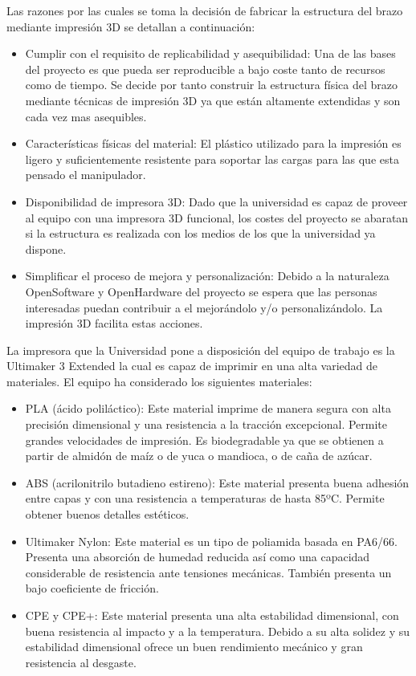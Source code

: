 Las razones por las cuales se toma la decisión de fabricar la estructura del brazo mediante impresión 3D se detallan a continuación:

\begin{itemize}
  \item Cumplir con el requisito de replicabilidad y asequibilidad: Una de las bases del proyecto es que pueda ser reproducible a bajo coste tanto de recursos como de tiempo. Se decide por tanto construir la estructura física del brazo mediante técnicas de impresión 3D ya que están altamente extendidas y son cada vez mas asequibles.
  
  \item Características físicas del material: El plástico utilizado para la impresión es ligero y suficientemente resistente para soportar las cargas para las que esta pensado el manipulador.
  
  \item Disponibilidad de impresora 3D: Dado que la universidad es capaz de proveer al equipo con una impresora 3D funcional, los costes del proyecto se abaratan si la estructura es realizada con los medios de los que la universidad ya dispone.
  
  \item Simplificar el proceso de mejora y personalización: Debido a la naturaleza OpenSoftware y OpenHardware del proyecto se espera que las personas interesadas puedan contribuir a el mejorándolo y/o personalizándolo. La impresión 3D facilita estas acciones.
\end{itemize}

La impresora que la Universidad pone a disposición del equipo de trabajo es la Ultimaker 3 Extended la cual es capaz de imprimir en una alta variedad de materiales. El equipo ha considerado los siguientes materiales:

\begin{itemize}
    \item PLA (ácido poliláctico): Este material imprime de manera segura con alta precisión dimensional y una resistencia a la tracción excepcional. Permite grandes velocidades de impresión. Es biodegradable ya que se obtienen a partir de almidón de maíz o de yuca o mandioca, o de caña de azúcar. 
    \item ABS (acrilonitrilo butadieno estireno): Este material presenta buena adhesión entre capas y con una resistencia a temperaturas de hasta 85ºC. Permite obtener buenos detalles estéticos.
    \item Ultimaker Nylon: Este material es un tipo de poliamida basada en PA6/66. Presenta una absorción de humedad reducida así como una capacidad considerable de resistencia ante tensiones mecánicas. También presenta un bajo coeficiente de fricción.
    \item CPE y CPE+: Este material presenta una alta estabilidad dimensional, con buena resistencia al impacto y a la temperatura. Debido a su alta solidez y su estabilidad dimensional ofrece un buen rendimiento mecánico y gran resistencia al desgaste.
\end{itemize}

